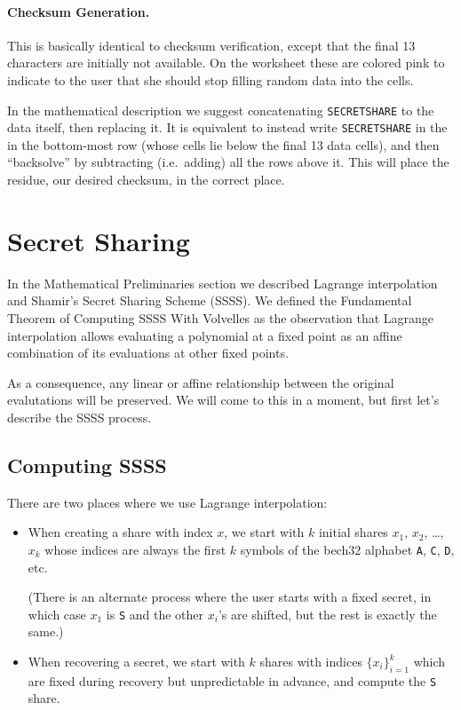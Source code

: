 \documentclass[letterpaper]{article}
\newcommand{\vc}[1]{\texttt{#1}} %
\begin{document}
\paragraph{Checksum Generation.} This is basically identical to checksum verification,
except that the final 13 characters are initially not available. On the worksheet these
are colored pink to indicate to the user that she should stop filling random data into
the cells.

In the mathematical description we suggest concatenating \vc{SECRETSHARE} to the data
itself, then replacing it. It is equivalent to instead write \vc{SECRETSHARE} in the
in the bottom-most row (whose cells lie below the final 13 data cells), and then
``backsolve'' by subtracting (i.e.~adding) all the rows above it. This will place
the residue, our desired checksum, in the correct place.

\section{Secret Sharing}

In the Mathematical Preliminaries section we described Lagrange interpolation and
Shamir's Secret Sharing Scheme (SSSS). We defined the Fundamental Theorem of Computing
SSSS With Volvelles as the observation that Lagrange interpolation allows evaluating
a polynomial at a fixed point as an affine combination of its evaluations at other
fixed points.

As a consequence, any linear or affine relationship between the original evalutations
will be preserved. We will come to this in a moment, but first let's describe the SSSS
process.

\subsection{Computing SSSS}

There are two places where we use Lagrange interpolation:
\begin{itemize}
\item When creating a share with index $x$, we start with $k$ initial shares $x_1$,
$x_2$, \ldots, $x_k$ whose indices are always the first $k$ symbols of the bech32
alphabet \vc{A}, \vc{C}, \vc{D}, etc.

(There is an alternate process where the user starts with a fixed secret, in which
case $x_1$ is \vc{S} and the other $x_i$'s are shifted, but the rest is exactly
the same.)
\item When recovering a secret, we start with $k$ shares with indices $\{x_i\}_{i=1}^k$
which are fixed during recovery but unpredictable in advance, and compute the
\vc{S} share.
\end{itemize}
\end{document}
